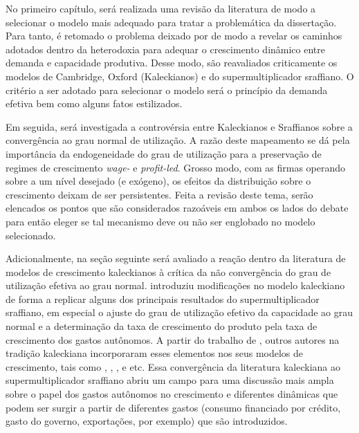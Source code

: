 

No primeiro capítulo, será realizada uma revisão da literatura de modo a selecionar o modelo mais adequado para tratar a problemática da dissertação. Para tanto, é retomado o problema deixado por \textcite{harrod_essay_1939} de modo a revelar os caminhos adotados dentro da heterodoxia para adequar o crescimento dinâmico entre demanda e capacidade produtiva. Desse modo, são reavaliados criticamente os modelos de Cambridge, Oxford (Kaleckianos) e do supermultiplicador sraffiano. O critério a ser adotado para selecionar o modelo será o princípio da demanda efetiva bem como alguns fatos estilizados. 

Em seguida, será investigada a controvérsia entre Kaleckianos e Sraffianos sobre a convergência ao grau normal de utilização. A razão deste mapeamento se dá pela importância da endogeneidade do grau de utilização para a preservação de regimes de crescimento \textit{wage-} e \textit{profit-led}. Grosso modo, com as firmas operando sobre a um nível desejado (e exógeno), os efeitos da distribuição sobre o crescimento deixam de ser persistentes. Feita a revisão deste tema, serão elencados os pontos que são considerados razoáveis em ambos os lados do debate para então eleger se tal mecanismo deve ou não ser englobado no modelo selecionado.

Adicionalmente, na seção seguinte será avaliado a reação dentro da literatura de modelos de crescimento kaleckianos à crítica da não convergência do grau de utilização efetiva ao grau normal. \textcite{allain_tackling_2015} introduziu modificações no modelo kaleckiano de forma a replicar alguns dos principais resultados do supermultiplicador sraffiano, em especial o ajuste do grau de utilização efetivo da capacidade ao grau normal e a determinação da taxa de crescimento do produto pela taxa de crescimento dos gastos autônomos. A partir do trabalho de \textcite{allain_tackling_2015}, outros autores na tradição kaleckiana incorporaram esses elementos nos seus modelos de crescimento, tais como \textcite{lavoie_convergence_2016}, \textcite{dutt_observations_2018}, \textcite{hein_autonomous_2018}, \textcite{nah_long-run_2017} e etc. Essa convergência da literatura kaleckiana ao supermultiplicador sraffiano abriu um campo para uma discussão mais ampla sobre o papel dos gastos autônomos no crescimento e diferentes dinâmicas que podem ser surgir a partir de diferentes gastos (consumo financiado por crédito, gasto do governo, exportações, por exemplo) que são introduzidos. 

